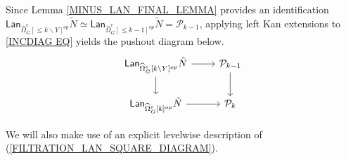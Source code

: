 \documentclass[a4paper,10pt
,draft
]{article}%
\numberwithin{equation}{section}
\numberwithin{figure}{section}
\theoremstyle{definition} %
\newcommand{\sSet}{\ensuremath{\mathsf{sSet}}}%
\renewcommand{\P}{\ensuremath{\mathcal P}}
\newcommand{\1}{\ensuremath{\mathbbm 1}}%
\begin{document}
Since Lemma \ref{MINUS_LAN_FINAL_LEMMA} provides an identification 
$\mathsf{Lan}_{\widehat{\Omega}_{G}^{e}[\leq\! k \mathbin{\backslash} Y]^{op}}\tilde{N} \simeq
\mathsf{Lan}_{\widehat{\Omega}_{G}^{e}[\leq\! k-1]^{op}}\tilde{N} = \mathcal{P}_{k-1}$,
applying left Kan extensions to \eqref{INCDIAG EQ} yields the pushout diagram below.
\begin{equation}\label{FILTRATION_LAN_SQUARE_DIAGRAM}
\begin{tikzcd}
	\mathsf{Lan}_{\widehat{\Omega}_{G}^e[k \mathbin{\backslash} Y]^{op}}\tilde{N} \arrow[d] \arrow[r] & 
	\P_{k-1} \arrow[d]
\\
	\mathsf{Lan}_{\widehat{\Omega}_{G}^e[k]^{op}}\tilde{N} \arrow[r] &
	\P_k
\end{tikzcd}
\end{equation}

We will also make use of an 
explicit levelwise description of  
(\ref{FILTRATION_LAN_SQUARE_DIAGRAM}).

\end{document}
